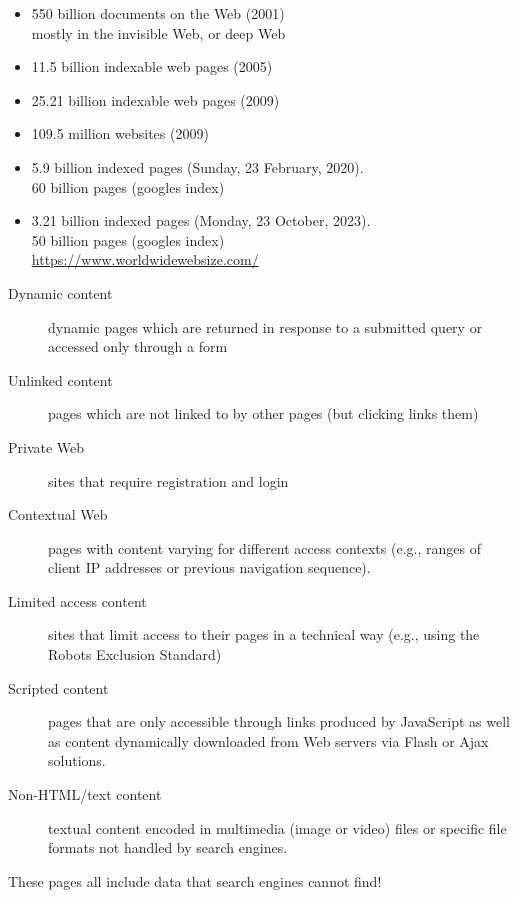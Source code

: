 \documentclass[a4paper,landscape,headrule,footrule,xetex]{foils}
\begin{document}
\begin{itemize}
\item 550 billion documents on the Web (2001)
  \\ mostly in the invisible Web, or deep Web
\item 11.5 billion indexable web pages (2005)
\item 25.21 billion indexable web pages (2009)
\item 109.5 million websites (2009)
\item 5.9 billion indexed pages (Sunday, 23 February, 2020).
  \\ 60 billion pages (googles index)
\item  3.21 billion indexed pages (Monday, 23 October, 2023).
    \\ 50 billion pages (googles index)
  \\ \url{https://www.worldwidewebsize.com/}
\end{itemize}

\begin{description}
\item [Dynamic content] dynamic pages which are returned in response to a submitted query or accessed only through a form
\item [Unlinked content] pages which are not linked to by other pages (but clicking links them)
\item [Private Web] sites that require registration and login
\item [Contextual Web] pages with content varying for different access contexts (e.g., ranges of client IP addresses or previous navigation sequence).
\item [Limited access content] sites that limit access to their pages
  in a technical way (e.g., using the Robots Exclusion Standard)
\item [Scripted content] pages that are only accessible through links produced by JavaScript as well as content dynamically downloaded from Web servers via Flash or Ajax solutions.
\item [Non-HTML/text content] textual content encoded in multimedia (image or video) files or specific file formats not handled by search engines.
\end{description}

These pages all include data that search engines cannot find!
\end{document}
